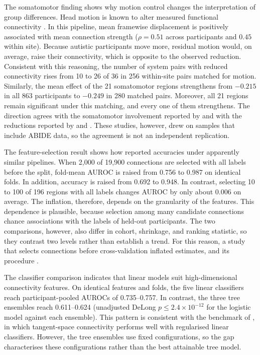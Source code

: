 The somatomotor finding shows why motion control changes the interpretation of group
differences. Head motion is known to alter measured functional connectivity
\citep{Poweretal2012}. In this pipeline, mean framewise displacement is positively
associated with mean connection strength ($\rho=0.51$ across participants and $0.45$ within
site). Because autistic participants move more, residual motion would, on average, raise
their connectivity, which is opposite to the observed reduction. Consistent with this
reasoning, the number of system pairs with reduced connectivity rises from 10 to 26 of 36 in
256 within-site pairs matched for motion. Similarly, the mean effect of the 21 somatomotor
regions strengthens from $-0.215$ in all 863 participants to $-0.249$ in 280 matched pairs.
Moreover, all 21 regions remain significant under this matching, and every one of them
strengthens. The direction agrees with
the somatomotor involvement reported by \citet{Chenetal2015} and with the reductions reported
by \citet{Holigaetal2019} and \citet{Ilioskaetal2023}. These studies, however, drew on
samples that include ABIDE data, so the agreement is not an independent replication.

The feature-selection result shows how reported accuracies  under
apparently similar pipelines. When 2,000 of 19,900 connections are selected with all labels
before the split, fold-mean AUROC is raised from 0.756 to 0.987 on identical folds. In
addition, accuracy is raised from 0.692 to 0.948. In contrast, selecting 10 to 100 of 196
regions with all labels changes AUROC by only about 0.006 on average. The inflation,
therefore, depends on the granularity of the features. This dependence is plausible, because
selection among many candidate connections  chance associations with the labels
of held-out participants. The two comparisons, however, also differ in cohort, shrinkage, and
ranking statistic, so they contrast two levels rather than establish a trend. For this
reason, a study that selects connections before cross-validation  inflated
estimates, and its procedure .

The classifier comparison indicates that linear models suit high-dimensional connectivity
features. On identical features and folds, the five linear classifiers reach
participant-pooled AUROCs of 0.735--0.757. In contrast, the three tree ensembles reach
0.611--0.624 (unadjusted DeLong $p\le2.4\times10^{-12}$ for the logistic model against each
ensemble). This pattern is consistent with the benchmark of \citet{Dadietal2019}, in which
tangent-space connectivity performs well with regularised linear classifiers. However, the
tree ensembles use fixed configurations, so the gap characterises these configurations
rather than the best attainable tree model.

